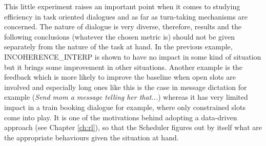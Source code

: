 				 This little experiment raises an important point when it comes to studying efficiency in task oriented dialogues and as far as turn-taking mechanisms are concerned. The nature of dialogue is very diverse, therefore, results and the following conclusions (whatever the chosen metric is) should not be given separately from the nature of the task at hand. In the previous example, INCOHERENCE\_INTERP is shown to have no impact in some kind of situation but it brings some improvement in other situations. Another example is the feedback which is more likely to improve the baseline when open slots are involved and especially long ones like this is the case in message dictation for example (\textit{Send mom a message telling her that...}) whereas it has very limited impact in a train booking dialogue for example, where only constrained slots come into play. It is one of the motivations behind adopting a data-driven approach (see Chapter \ref{ch:rl}), so that the Scheduler figures out by itself what are the appropriate behaviours given the situation at hand.
        
        
    